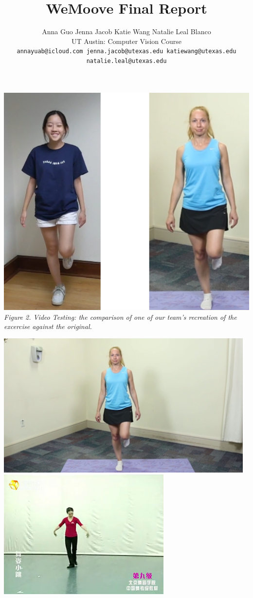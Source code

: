\documentclass[10pt,twocolumn,letterpaper]{article}
\title{WeMoove Final Report}
\author{Anna Guo \qquad Jenna Jacob \qquad Katie Wang \qquad Natalie Leal Blanco\\
UT Austin: Computer Vision Course\\
{\tt\small annayuab@icloud.com \quad jenna.jacob@utexas.edu \quad katiewang@utexas.edu \quad natalie.leal@utexas.edu}\\
\and
}
\begin{document}
\maketitle
    



\includegraphics[width=\columnwidth]{sec/single_leg_comparison}
\textit{Figure 2. Video Testing: the comparison of one of our team's recreation of the excercise against the original.}

\includegraphics[width=\columnwidth]{sec/single_leg_image}
\includegraphics[width=\columnwidth]{sec/chinese_dance_image}
\end{document}

